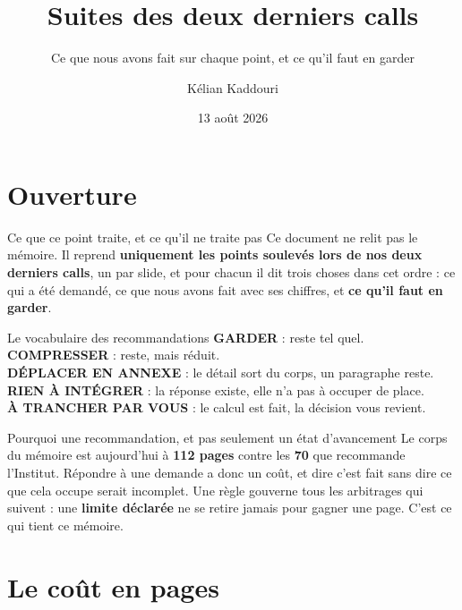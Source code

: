 \documentclass[11pt]{beamer}
\title[Suites des deux derniers calls]{Suites des deux derniers calls}
\subtitle{Ce que nous avons fait sur chaque point, et ce qu'il faut en garder}
\author[K. Kaddouri]{Kélian Kaddouri}
\institute[ENSAE / Nexialog]{ENSAE / Nexialog Consulting}
\date[13/08/2026]{13 août 2026}
\newcommand{\garder}{\textbf{GARDER}}
\newcommand{\compresser}{\textbf{COMPRESSER}}
\newcommand{\annexer}{\textbf{DÉPLACER EN ANNEXE}}
\newcommand{\rien}{\textbf{RIEN À INTÉGRER}}
\newcommand{\atrancher}{\textbf{À TRANCHER PAR VOUS}}
\begin{document}
\section*{Ouverture}


\begin{frame}
\titlepage
\end{frame}

\begin{frame}{Ce que ce point traite, et ce qu'il ne traite pas}
\scriptsize
Ce document ne relit pas le mémoire. Il reprend \textbf{uniquement les points soulevés lors de
nos deux derniers calls}, un par slide, et pour chacun il dit trois choses dans cet ordre : ce
qui a été demandé, ce que nous avons fait avec ses chiffres, et \textbf{ce qu'il faut en
garder}.
\vspace{1.5mm}
\begin{block}{Le vocabulaire des recommandations}
\garder{} : reste tel quel. \quad \compresser{} : reste, mais réduit.\\
\annexer{} : le détail sort du corps, un paragraphe reste. \quad
\rien{} : la réponse existe, elle n'a pas à occuper de place.\\
\atrancher{} : le calcul est fait, la décision vous revient.
\end{block}
\vspace{-1mm}
\begin{block}{Pourquoi une recommandation, et pas seulement un état d'avancement}
Le corps du mémoire est aujourd'hui à \textbf{112 pages} contre les \textbf{70} que recommande
l'Institut. Répondre à une demande a donc un coût, et dire \og c'est fait \fg{} sans dire ce
que cela occupe serait incomplet. Une règle gouverne tous les arbitrages qui suivent : une
\textbf{limite déclarée} ne se retire jamais pour gagner une page. C'est ce qui tient ce
mémoire.
\end{block}
\end{frame}

\section*{Le coût en pages}

\end{document}
